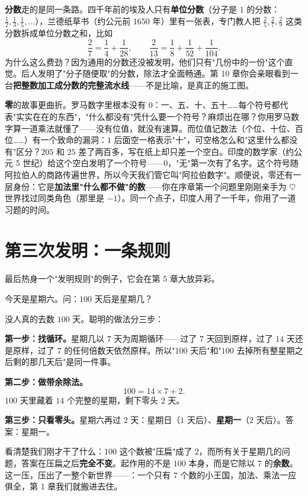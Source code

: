 \textbf{分数}走的是同一条路。四千年前的埃及人只有\textbf{单位分数}（分子是 $1$ 的分数：$\tfrac12, \tfrac13, \tfrac15,\dots$），兰德纸草书（约公元前 1650 年）里有一张表，专门教人把 $\tfrac25, \tfrac27, \tfrac29$ 这类分数拆成单位分数之和，比如
\[
\frac{2}{7} = \frac{1}{4} + \frac{1}{28}, \qquad \frac{2}{13} = \frac{1}{8} + \frac{1}{52} + \frac{1}{104}.
\]
为什么这么费劲？因为通用的分数还没被发明，他们只有"几份中的一份"这个直觉。后人发明了"分子随便取"的分数，除法才全面畅通。第 10 章你会亲眼看到一台\textbf{把整数加工成分数的完整流水线}——不是比喻，是真正的施工图。

\textbf{零}的故事更曲折。罗马数字里根本没有 $0$：一、五、十、五十……每个符号都代表"实实在在的东西"，"什么都没有"凭什么要一个符号？麻烦出在哪？你用罗马数字算一道乘法就懂了——没有位值，就没有速算。而位值记数法（个位、十位、百位……）有一个致命的漏洞：$1$ 后面空一格表示"十"，可空格怎么和"这里什么都没有"区分？$205$ 和 $25$ 差了两百多，写在纸上却只差一个空白。印度的数学家（约公元 5 世纪）给这个空白发明了一个符号——$0$，"无"第一次有了名字。这个符号随阿拉伯人的商路传遍世界，所以今天我们管它叫"阿拉伯数字"。顺便说，零还有一层身份：它是\textbf{加法里"什么都不做"的数}——你在序章第一个问题里刚刚亲手为 $\heartsuit$ 世界找过同类角色（那里是 $-1$）。同一个点子，印度人用了一千年，你用了一道习题的时间。

\section{第三次发明：一条规则}

最后热身一个"发明规则"的例子，它会在第 5 章大放异彩。

\begin{kaiwei}
今天是星期六。问：$100$ 天后是星期几？
\end{kaiwei}

没人真的去数 $100$ 天。聪明的做法分三步：

\textbf{第一步：找循环。}星期几以 $7$ 天为周期循环——过了 $7$ 天回到原样，过了 $14$ 天还是原样，过了 $7$ 的任何倍数天依然原样。所以"$100$ 天后"和"$100$ 去掉所有整星期之后剩的那几天后"是同一件事。

\textbf{第二步：做带余除法。}
\[
100 = 14 \times 7 + 2 .
\]
$100$ 天里藏着 $14$ 个完整的星期，剩下零头 $2$ 天。

\textbf{第三步：只看零头。}星期六再过 $2$ 天：星期日（$1$ 天后）、\textbf{星期一}（$2$ 天后）。答案：星期一。

看清楚我们刚才干了什么：$100$ 这个数被"压扁"成了 $2$，而所有关于星期几的问题，答案在压扁之后\textbf{完全不变}。起作用的不是 $100$ 本身，而是它除以 $7$ 的\textbf{余数}。这一压，压出了一整个新世界——：一个只有 $7$ 个数的小王国，加法、乘法一应俱全，第 1 章我们就搬进去住。


